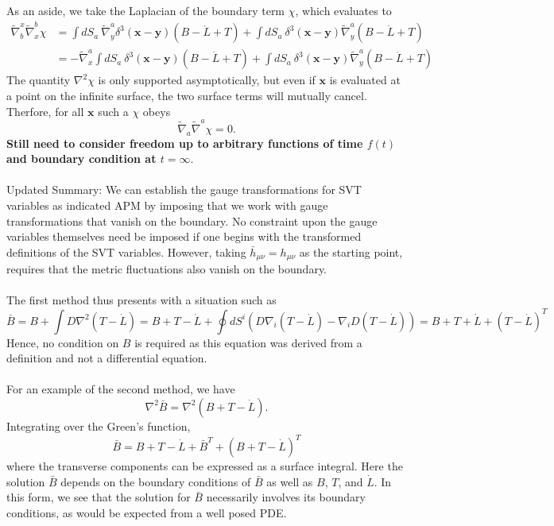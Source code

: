 \documentclass[10pt,letterpaper]{article}
\numberwithin{equation}{subsection}
\begin{document}
As an aside, we take the Laplacian of the boundary term $\chi$, which evaluates to
\begin{align}
\tilde\nabla_b^x\tilde\nabla^b_x \chi &=  \int dS_a\   \tilde\nabla^a_y \delta^3(\mathbf x - \mathbf y)(B-\dot L + T) + \int dS_a\  \delta^3(\mathbf x - \mathbf y)\tilde\nabla^a_y(B-\dot L + T)
\nonumber \\
&= -\tilde\nabla^a_x \int dS_a\ \delta^3(\mathbf x- \mathbf y)(B-\dot L + T)+ \int dS_a\  \delta^3(\mathbf x - \mathbf y)\tilde\nabla^a_y(B-\dot L + T)
\end{align}
The quantity $\nabla^2 \chi$ is only supported asymptotically, but even if $\mathbf x$ is evaluated at a point on the infinite surface, the two surface terms will mutually cancel. Therfore, for all $\mathbf x$ such a $\chi$ obeys 
\begin{equation}
\tilde\nabla_a\tilde\nabla^a \chi = 0.
\end{equation}
\textbf{Still need to consider freedom up to arbitrary functions of time $f(t)$ and boundary condition at $t=\infty$}.
\\ \\
Updated Summary: We can establish the gauge transformations for SVT variables as indicated APM by imposing that we work with gauge transformations that vanish on the boundary. No constraint upon the gauge variables themselves need be imposed if one begins with the transformed definitions of the SVT variables. However, taking $\bar h_{\mu\nu} = h_{\mu\nu}$ as the starting point, requires that the metric fluctuations also vanish on the boundary. 
\\ \\
The first method thus presents with a situation such as
\begin{equation}
\bar B = B + \int D \nabla^2 (T-\dot L) = B+T-\dot L + \oint dS^i( D\nabla_i(T-\dot L) - \nabla_i D(T-\dot L))
= B + T+\dot L +  (T-\dot L)^T
\end{equation} 
Hence, no condition on $B$ is required as this equation was derived from a definition and not a differential equation.
\\ \\
For an example of the second method,  we have 
\begin{equation}
\nabla^2 \bar B = \nabla^2 (B+T-\dot L).
\end{equation}
Integrating over the Green's function,
\begin{equation}
\bar B = B + T -\dot L + \bar B^T + (B+T-\dot L)^T
\end{equation}
where the transverse components can be expressed as a surface integral. Here the solution $\bar B$ depends on the boundary conditions of $\bar B$ as well as $B$, $T$, and $\dot L$. 
In this form, we see that the solution for $\bar B$ necessarily involves its boundary conditions, as would be expected from a well posed PDE. 
\end{document}
